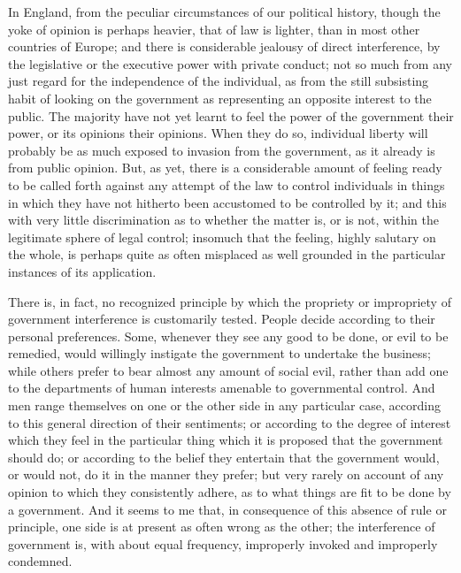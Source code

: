 \documentclass[12pt]{report}
\begin{document}
In England, from the peculiar circumstances of our political history, though the yoke of opinion is perhaps heavier, that of law is lighter, than in most other countries of Europe; and there is considerable jealousy of direct interference, by the legislative or the executive power with private conduct; not so much from any just regard for the independence of the individual, as from the still subsisting habit of looking on the government as representing an opposite interest to the public. The majority have not yet learnt to feel the power of the government their power, or its opinions their opinions. When they do so, individual liberty will probably be as much exposed to invasion from the government, as it already is from public opinion. But, as yet, there is a considerable amount of feeling ready to be called forth against any attempt of the law to control individuals in things in which they have not hitherto been accustomed to be controlled by it; and this with very little discrimination as to whether the matter is, or is not, within the legitimate sphere of legal control; insomuch that the feeling, highly salutary on the whole, is perhaps quite as often misplaced as well grounded in the particular instances of its application.

There is, in fact, no recognized principle by which the propriety or impropriety of government interference is customarily tested. People decide according to their personal preferences. Some, whenever they see any good to be done, or evil to be remedied, would willingly instigate the government to undertake the business; while others prefer to bear almost any amount of social evil, rather than add one to the departments of human interests amenable to governmental control. And men range themselves on one or the other side in any particular case, according to this general direction of their sentiments; or according to the degree of interest which they feel in the particular thing which it is proposed that the government should do; or according to the belief they entertain that the government would, or would not, do it in the manner they prefer; but very rarely on account of any opinion to which they consistently adhere, as to what things are fit to be done by a government. And it seems to me that, in consequence of this absence of rule or principle, one side is at present as often wrong as the other; the interference of government is, with about equal frequency, improperly invoked and improperly condemned.
\end{document}
